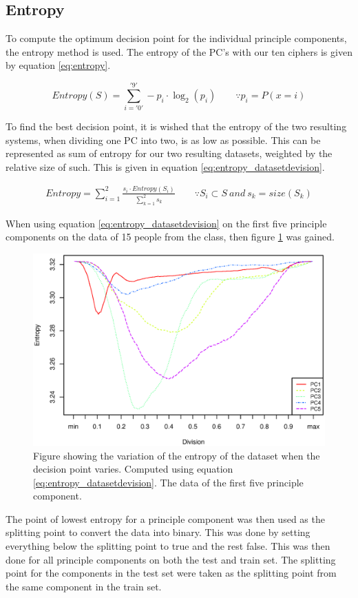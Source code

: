 \subsection{Entropy}
To compute the optimum decision point for the individual principle components, the entropy method is used.
The entropy of the PC's with our ten ciphers is given by equation \ref{eq:entropy}.

\begin{equation}
Entropy(S) = \sum_{i = '0'}^{'9'} -p_i \cdot \log_2(p_i) 
\qquad \because p_i = P(x = i)
\label{eq:entropy}
\end{equation}

To find the best decision point, it is wished that the entropy of the two resulting systems, when dividing one PC into two, is as low as possible.
This can be represented as sum of entropy for our two resulting datasets, weighted by the relative size of such.
This is given in equation \ref{eq:entropy_datasetdevision}.

\begin{eqnarray}
Entropy = \sum_{i = 1}^{2} \frac{s_i \cdot Entropy(S_i)}{\sum_{k = 1}^{2} s_k} 
\qquad \because S_i \subset S\ and\ s_k = size(S_k)
\label{eq:entropy_datasetdevision}
\end{eqnarray}

When using equation \ref{eq:entropy_datasetdevision} on the first five principle components on the data of 15 people from the class, then figure \ref{fig:entropy_pc5} was gained.

\begin{figure}[H]
\centering
\includegraphics[width = 0.95 \textwidth]{graphics/entropy_pc}
\caption{Figure showing the variation of the entropy of the dataset when the decision point varies. Computed using equation \ref{eq:entropy_datasetdevision}. The data of the first five principle component.}
\label{fig:entropy_pc5}
\end{figure}


The point of lowest entropy for a principle component was then used as the splitting point to convert the data into binary.
This was done by setting everything below the splitting point to true and the rest false.
This was then done for all principle components on both the test and train set. 
The splitting point for the components in the test set were taken as the splitting point from the same component in the train set.